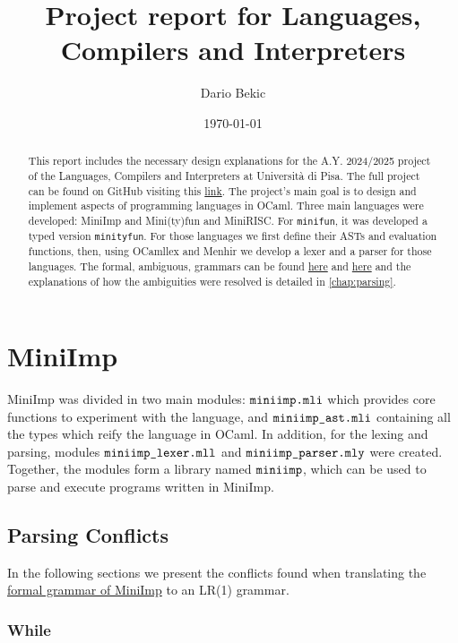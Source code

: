 \documentclass[a4paper,11pt]{report}
\title{Project report for Languages, Compilers and Interpreters}
\author{Dario Bekic}
\date{\today}
\begin{document}
\maketitle
\tableofcontents

\begin{abstract}
This report includes the necessary design explanations for the A.Y. 2024/2025 project of the Languages, Compilers and Interpreters at Università di Pisa.
The full project can be found on GitHub visiting this \href{https://github.com/wuacs/unipi-lci/tree/main/project}{link}.
The project's main goal is to design and implement aspects of programming languages in OCaml. Three main languages were developed: MiniImp and Mini(ty)fun and MiniRISC. For \verb|minifun|, it was developed a typed version \verb|minityfun|. For those languages we first define their ASTs and evaluation functions, then, using OCamllex and Menhir we develop a lexer and a parser for those languages. The formal, ambiguous, grammars can be found \href{https://lceragioli.github.io/pages/Slides/semantics.pdf}{here} and \href{https://lceragioli.github.io/pages/Slides/types.pdf}{here} and the explanations of how the ambiguities were resolved is detailed in \autoref{chap:parsing}.
\end{abstract}

\section{MiniImp}\label{Section::MiniImp}

MiniImp was divided in two main modules: $\verb|miniimp.mli|$ which provides core functions to experiment with the language, and $\verb|miniimp_ast.mli|$ containing all the types which reify the language in OCaml.
In addition, for the lexing and parsing, modules $\verb|miniimp_lexer.mll|$ and $\verb|miniimp_parser.mly|$ were created. Together, the modules form a library named $\verb|miniimp|$, which can be used to parse and execute programs written in MiniImp.

\subsection{Parsing Conflicts}\label{Sec::parsingImp}

In the following sections we present the conflicts found when translating the \href{https://lceragioli.github.io/pages/Slides/semantics.pdf}{formal grammar of MiniImp} to an LR(1) grammar.

\subsubsection{While}
\end{document}
